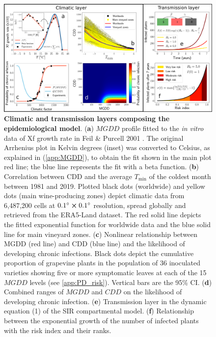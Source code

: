 \begin{figure}[H]
    \centering
    \includegraphics[width=\textwidth]{Figures/Fig1.pdf}
    \caption[Climatic and transmission layers composing the
        epidemiological model]{\textbf{Climatic and transmission layers
            composing
            the
            epidemiological model}. (\textbf{a}) $MGDD$ profile fitted to the
        \textit{in
            vitro } data of Xf growth rate in Feil \& Purcell 2001
        \cite{Feil2001}. The
        original Arrhenius plot in Kelvin degrees (inset) was converted to
        Celsius, as
        explained in (\cref{app:MGDD}), to obtain the fit shown in the
        main
        plot red line; the blue line represents the fit with a beta function.
        (\textbf{b}) Correlation between CDD and the average $T_{\textrm{min}}$
        of the
        coldest month between 1981 and 2019. Plotted black dots (worldwide) and
        yellow
        dots (main wine-producing zones) depict climatic data from 6,487,200
        cells at
        $\SI{0.1}{\degree} \cross \SI{0.1}{\degree}$ resolution, spread
        globally and
        retrieved from the ERA5-Land dataset. The red solid line depicts the
        fitted
        exponential function for worldwide data and the blue solid line for
        main
        vineyard zones. (\textbf{c}) Nonlinear relationship between MGDD (red
        line) and
        CDD (blue line) and the likelihood of developing chronic infections.
        Black dots
        depict the cumulative proportion of grapevine plants in the population
        of $36$
        inoculated varieties showing five or more symptomatic leaves at each of
        the 15
        $MGDD$ levels (see \cref{app:PD_risk}). Vertical bars are the
        95\% CI.
        (\textbf{d}) Combined ranges of $MGDD$ and $CDD$ on the likelihood of
        developing chronic infection. (\textbf{e}) Transmission layer in the
        dynamic
        equation (1) of the SIR compartmental model. (\textbf{f}) Relationship
        between
        the exponential growth of the number of infected plants with the risk
        index and
        their ranks.}
    \label{fig1}
\end{figure}

